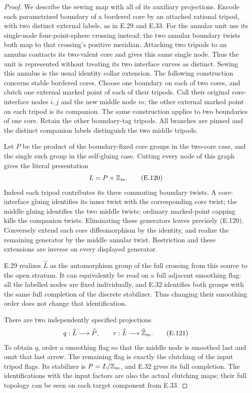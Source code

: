 \begin{proof}
We describe the sewing map with all of its auxiliary
projections.  Encode each parametrized boundary of a
bordered core by an attached rational tripod, with two
distinct external labels, as in E.29 and E.33.
For the annular unit use its single-node four-point-sphere
crossing instead: the two annular boundary twists both
map to that crossing's positive meridian.  Attaching two
tripods to an annulus contracts its two-valent core and
gives this same single node.  Thus the unit is represented
without treating its two interface curves as distinct.
Sewing this annulus is the usual identity collar extension.
The following construction concerns stable bordered cores.
Choose one boundary on each of two cores, and clutch
one external marked point of each of their tripods.
Call their original core-interface nodes $i,j$ and
the new middle node $m$; the other external marked
point on each tripod is its companion.
The same construction applies to two boundaries of
one core.  Retain the other boundary-tag tripods.
All branches are pinned and the distinct companion
labels distinguish the two middle tripods.

Let $P$ be the product of the boundary-fixed core
groups in the two-core case, and the single such
group in the self-gluing case.  Cutting every node
of this graph gives the literal presentation
\[
                 L=P\times\mathbb Z_m.                             \tag{E.120}
\]
Indeed each tripod contributes its three commuting
boundary twists.  A core-interface gluing identifies
its inner twist with the corresponding core twist;
the middle gluing identifies the two middle twists;
ordinary marked-point capping kills the companion
twists.  Eliminating these generators leaves precisely
(E.120).  Conversely extend each core diffeomorphism
by the identity, and realize the remaining generator
by the middle annular twist.  Restriction and these
extensions are inverse on every displayed generator.

E.29 realizes $\widehat L$ as the automorphism group
of the full crossing from this source to the open
stratum.  It can equivalently be read on a full
adjacent smoothing flag: all the labelled nodes are
fixed individually, and E.32 identifies both groups
with the same full completion of the discrete
stabilizer.  Thus changing their smoothing order
does not change that identification.

There are two independently specified projections
\[
 q:\widehat L\longrightarrow\widehat P,
 \qquad r:\widehat L\longrightarrow\widehat{\mathbb Z}_m.              \tag{E.121}
\]
To obtain $q$, order a smoothing flag so that the
middle node is smoothed last and omit that last
arrow.  The remaining flag is exactly the clutching
of the input tripod flags.  Its stabilizer is
$P=L/\mathbb Z_m$, and E.32 gives its full completion.
The identifications with the input factors are
also the actual clutching maps; their full topology
can be seen on each target component from E.33.


\end{proof}
